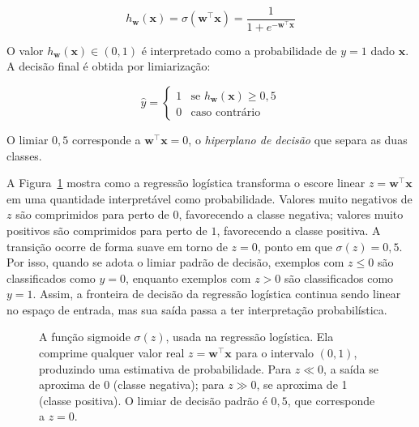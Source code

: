 \documentclass[12pt,a4paper]{article}
\begin{document}
\[
h_\mathbf{w}(\mathbf{x}) = \sigma(\mathbf{w}^\top \mathbf{x}) = \frac{1}{1 + e^{-\mathbf{w}^\top \mathbf{x}}}
\]

O valor $h_\mathbf{w}(\mathbf{x}) \in (0,1)$ é interpretado como a probabilidade de $y = 1$ dado $\mathbf{x}$. A decisão final é obtida por limiarização:

\[
\hat{y} = \begin{cases} 1 & \text{se } h_\mathbf{w}(\mathbf{x}) \geq 0{,}5 \\ 0 & \text{caso contrário} \end{cases}
\]

O limiar $0{,}5$ corresponde a $\mathbf{w}^\top \mathbf{x} = 0$, o \emph{hiperplano de decisão} que separa as duas classes.

A Figura~\ref{fig:sigmoide} mostra como a regressão logística transforma o escore linear $z = \mathbf{w}^\top \mathbf{x}$ em uma quantidade interpretável como probabilidade. Valores muito negativos de $z$ são comprimidos para perto de $0$, favorecendo a classe negativa; valores muito positivos são comprimidos para perto de $1$, favorecendo a classe positiva. A transição ocorre de forma suave em torno de $z=0$, ponto em que $\sigma(z)=0{,}5$. Por isso, quando se adota o limiar padrão de decisão, exemplos com $z \leq 0$ são classificados como $y=0$, enquanto exemplos com $z>0$ são classificados como $y=1$. Assim, a fronteira de decisão da regressão logística continua sendo linear no espaço de entrada, mas sua saída passa a ter interpretação probabilística.

\begin{figure}[ht]
\centering
{}
\caption{A função sigmoide $\sigma(z)$, usada na regressão logística. Ela comprime qualquer valor real $z = \mathbf{w}^\top \mathbf{x}$ para o intervalo $(0,1)$, produzindo uma estimativa de probabilidade. Para $z \ll 0$, a saída se aproxima de 0 (classe negativa); para $z \gg 0$, se aproxima de 1 (classe positiva). O limiar de decisão padrão é $0{,}5$, que corresponde a $z = 0$.}
\label{fig:sigmoide}
\end{figure}
\end{document}
